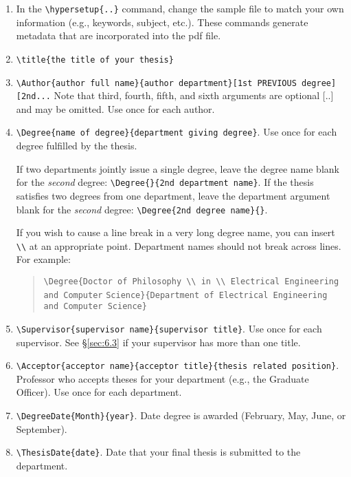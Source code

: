 \documentclass[11pt]{article}
\begin{document}
\begin{enumerate}
\item In the \verb|\hypersetup{..}| command, change the sample file to match your own information (e.g., keywords, subject, etc.). These commands generate metadata that are incorporated into the pdf file.  

\item \verb|\title{the title of your thesis}|

\item \verb|\Author{author full name}{author department}[1st PREVIOUS degree][2nd...| \linebreak
Note that third, fourth, fifth, and sixth arguments are optional [..] and may be omitted.  Use once for each author.

\item \verb|\Degree{name of degree}{department giving degree}|. Use once for each degree fulfilled by the thesis. 

If two departments jointly issue a single degree, leave the degree name blank for the \textit{second} degree: 
\verb|\Degree{}{2nd department name}|.  
If the thesis satisfies two degrees from one department, leave the department argument blank for 
the \textit{second} degree: \verb|\Degree{2nd degree name}{}|. 

If you wish to cause a line break in a very long degree name, you can insert \verb|\\| at an appropriate point.
Department names should not break across lines.  For example:
\begin{quote}
\verb|\Degree{Doctor of Philosophy \\ in \\ Electrical Engineering and Computer|\linebreak
\hbox{}\qquad\verb|Science}{Department of Electrical Engineering and Computer Science}|
\end{quote}

\item \verb|\Supervisor{supervisor name}{supervisor title}|. Use once for each supervisor. See \S\ref{sec:6.3} if your supervisor has more than one title.

\item \verb|\Acceptor{acceptor name}{acceptor title}{thesis related position}|. Professor who accepts theses for your department (e.g., the Graduate Officer). Use once for each department. 

\item \verb|\DegreeDate{Month}{year}|. Date degree is awarded (February, May, June, or September).  

\item \verb|\ThesisDate{date}|. Date that your final thesis is submitted to the department.
\end{enumerate}
\end{document}

